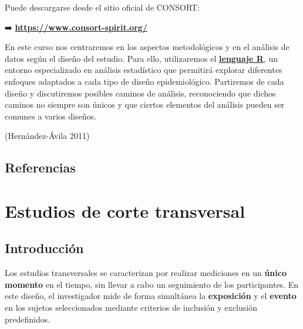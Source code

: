 \documentclass[
  spanish,
  a4paper,
]{scrbook}
\begin{document}
Puede descargarse desde el sitio oficial de CONSORT:

➡️
\href{https://www.consort-spirit.org/}{\textbf{https://www.consort-spirit.org/}}

\begin{tcolorbox}[enhanced jigsaw, arc=.35mm, bottomrule=.15mm, breakable, colback=white, colframe=quarto-callout-warning-color-frame, left=2mm, leftrule=.75mm, opacityback=0, rightrule=.15mm, toprule=.15mm]
\begin{minipage}[t]{5.5mm}
\textcolor{quarto-callout-warning-color}{\faExclamationTriangle}
\end{minipage}%
\begin{minipage}[t]{\textwidth - 5.5mm}

En este curso nos centraremos en los aspectos metodológicos y en el
análisis de datos según el diseño del estudio. Para ello, utilizaremos
el \hyperref[introducciuxf3n-a-r]{\textbf{lenguaje R}}, un entorno
especializado en análisis estadístico que permitirá explorar diferentes
enfoques adaptados a cada tipo de diseño epidemiológico. Partiremos de
cada diseño y discutiremos posibles caminos de análisis, reconociendo
que dichos caminos no siempre son únicos y que ciertos elementos del
análisis pueden ser comunes a varios diseños.

\end{minipage}%
\end{tcolorbox}

(Hernández-Ávila 2011)

\section{Referencias}\label{referencias-4}

\chapter{Estudios de corte
transversal}\label{estudios-de-corte-transversal}

\section{Introducción}\label{introducciuxf3n-4}

Los estudios transversales se caracterizan por realizar mediciones en un
\textbf{único momento} en el tiempo, sin llevar a cabo un seguimiento de
los participantes. En este diseño, el investigador mide de forma
simultánea la \textbf{exposición} y el \textbf{evento} en los sujetos
seleccionados mediante criterios de inclusión y exclusión predefinidos.
\end{document}
